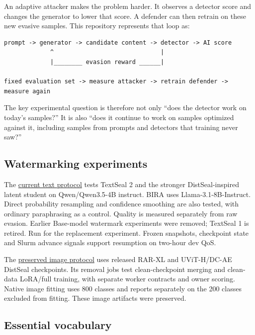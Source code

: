 An adaptive attacker makes the problem harder. It observes a detector
score and changes the generator to lower that score. A defender can then
retrain on these new evasive samples. This repository represents that
loop as:

\begin{Verbatim}
prompt -> generator -> candidate content -> detector -> AI score
             ^                              |
             |________ evasion reward ______|

fixed evaluation set -> measure attacker -> retrain defender -> measure again
\end{Verbatim}

The key experimental question is therefore not only ``does the detector
work on today's samples?'' It is also ``does it continue to work on
samples optimized against it, including samples from prompts and
detectors that training never saw?''

\subsection{Watermarking
experiments}\label{record-docs-research-guide-md-watermarking-experiments}

The \href{records/docs/instruct_watermarking.tex}{current text protocol}
tests TextSeal 2 and the stronger DistSeal-inspired latent student on
Qwen/Qwen3.5-4B instruct. BIRA uses Llama-3.1-8B-Instruct. Direct
probability resampling and confidence smoothing are also tested, with
ordinary paraphrasing as a control. Quality is measured separately from
raw evasion. Earlier Base-model watermark experiments were removed;
TextSeal 1 is retired. Run
\texttt{} for the
replacement experiment. Frozen snapshots, checkpoint state and Slurm
advance signals support resumption on two-hour dev QoS.

The \href{records/docs/watermarking.tex}{preserved image protocol} uses
released RAR-XL and UViT-H/DC-AE DistSeal checkpoints. Its removal jobs
test clean-checkpoint merging and clean-data LoRA/full training, with
separate worker contracts and owner scoring. Native image fitting uses
800 classes and reports separately on the 200 classes excluded from
fitting. These image artifacts were preserved.

\subsection{Essential
vocabulary}\label{record-docs-research-guide-md-essential-vocabulary}

